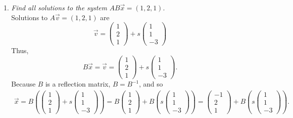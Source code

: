 \documentclass[12pt]{article}
\begin{document}
\begin{enumerate}[label=(\alph*)]
	\item \textit{Find all solutions to the system $AB\vec{x} = (1, 2, 1)$.}
	\\[\baselineskip]
	Solutions to $A\vec{v} = (1, 2, 1)$ are
	\begin{equation*}
		\vec{v} =
		\begin{pmatrix} 1 \\ 2 \\ 1 \end{pmatrix}
		+ s \begin{pmatrix} 1 \\ 1 \\ -3 \end{pmatrix}
	\end{equation*}
	Thus,
	\begin{equation*}
		B\vec{x} = \vec{v} =
		\begin{pmatrix} 1 \\ 2 \\ 1 \end{pmatrix}
		+ s \begin{pmatrix} 1 \\ 1 \\ -3 \end{pmatrix}
		.
	\end{equation*}
	Because $B$ is a reflection matrix, $B = B^{-1}$, and so
	\begin{align*}
		\vec{x} = B(
		\begin{pmatrix} 1 \\ 2 \\ 1 \end{pmatrix}
		+ s \begin{pmatrix} 1 \\ 1 \\ -3 \end{pmatrix}
		)
		=
		B \begin{pmatrix} 1 \\ 2 \\ 1 \end{pmatrix}
		+ B (s \begin{pmatrix} 1 \\ 1 \\ -3 \end{pmatrix})
		=
		\boxed{
			\begin{pmatrix} -1 \\ 2 \\ 1 \end{pmatrix}
			+ B (s \begin{pmatrix} 1 \\ 1 \\ -3 \end{pmatrix})
		}
		.
	\end{align*}
\end{enumerate}
\end{document}
